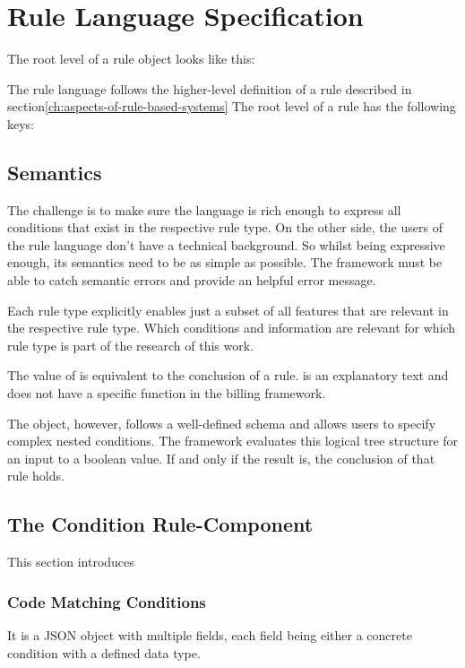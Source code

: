 \section{Rule Language Specification}\label{sec:rule-language-specification}

The root level of a rule object looks like this:

The rule language follows the higher-level definition of a rule described in section\ref{ch:aspects-of-rule-based-systems}
The root level of a rule has the following keys:

\subsection{Semantics}
The challenge is to make sure the language is rich enough
to express all conditions that exist in the respective rule type.
On the other side, the users of the rule language don't have a technical background.
So whilst being expressive enough, its semantics need to be as simple as possible.
The framework must be able to catch semantic errors and provide an helpful error message.

Each rule type explicitly enables just a subset of all features that are relevant in the respective rule type.
Which conditions and information are relevant for which rule type is part of the research of this work.







The value of is equivalent to the conclusion of a rule\cite{abdullah2017performance}.
 is an explanatory text and does not have a specific function in the billing framework.

The object, however, follows a well-defined schema and allows users to specify complex nested conditions.
The framework evaluates this logical tree structure for an input to a boolean value.
If and only if the result is, the conclusion of that rule holds.


\subsection{The Condition Rule-Component}\label{subsec:the-condition-component}

This section introduces



\subsubsection{Code Matching Conditions}





It is a JSON object with multiple fields, each field being either a concrete condition with a defined data type.



